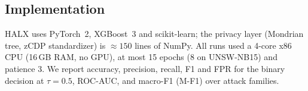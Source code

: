 \subsection{Implementation}
HALX uses PyTorch~2, XGBoost~3 and scikit-learn; the privacy layer
(Mondrian tree, zCDP standardizer) is ${\approx}150$ lines of NumPy. All
runs used a 4-core x86 CPU (16\,GB RAM, no GPU), at most 15 epochs (8 on
UNSW-NB15) and patience 3. We report accuracy, precision, recall, F1 and
FPR for the binary decision at $\tau=0.5$, ROC-AUC, and macro-F1 (M-F1)
over attack families.
